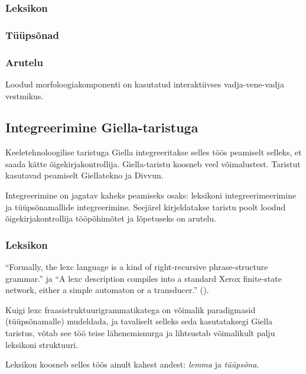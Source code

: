 \documentclass[12pt,a4paper]{article}
\begin{document}
\subsubsection{Leksikon}
\label{sec:gf-leksikon}

\subsubsection{Tüüpsõnad}
\label{sec:gf-tüüpsõnad}

\subsubsection{Arutelu}
\label{sec:gf-arutelu}

Loodud morfoloogiakomponenti on kasutatud interaktiivses vadja-vene-vadja vestmikus.





\subsection{Integreerimine Giella-taristuga}

Keeletehnoloogilise taristuga Giella integreeritakse selles töös peamiselt selleks, et saada kätte õigekirja\-kontrollija. Giella-taristu koosneb veel võimalustest. Taristut kasutavad peamiselt Giellatekno ja Divvun.

Integreerimine on jagatav kaheks peamiseks osaks: leksikoni integreerimeerimine ja tüüpsõnamallide integreerimine. Seejärel kirjeldatakse taristu poolt loodud õigekirjakontrollija tööpõhimõtet ja lõpetuseks on arutelu.

\subsubsection{Leksikon}
\label{sec:giella-leksikon}

``Formally, the lexc language is a kind of right-recursive phrase-structure 
grammar.'' ja ``A lexc description compiles into a standard Xerox finite-state network, either a simple automaton or a transducer.'' (\cite[lk~203]{beesley_finite_2003}).

Kuigi lexc fraasi\-struktuuri\-grammatikatega on võimalik paradigmasid (tüüpsõnamalle) mudeldada, ja tavaliselt selleks seda kasutataksegi Giella taristus, võtab see töö teise lähenemisnurga ja lihtsustab võimalikult palju leksikoni struktuuri.

Leksikon koosneb selles töös ainult kahest andest: \textit{lemma} ja \textit{tüüpsõna}. 
\end{document}
